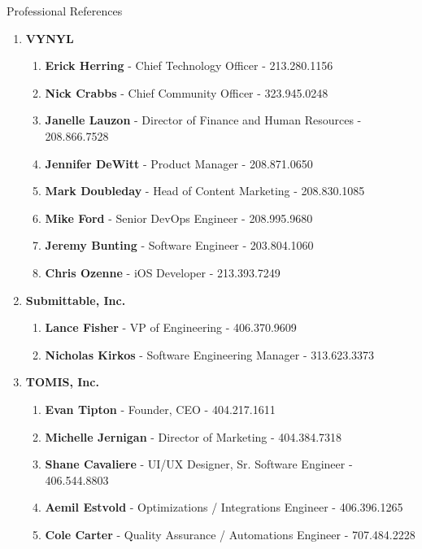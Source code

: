 \documentclass[oneside]{article}%
\begin{document}
\newpage
\noindent
\huge{Professional References}\\
\small
\begin{enumerate}[]
	\item \large \textbf{VYNYL} \small
		\begin{enumerate}[]
			\item \textbf{Erick Herring} - Chief Technology Officer - 213.280.1156
			\item \textbf{Nick Crabbs} - Chief Community Officer - 323.945.0248
			\item \textbf{Janelle Lauzon} - Director of Finance and Human Resources - 208.866.7528
			\item \textbf{Jennifer DeWitt} - Product Manager - 208.871.0650
			\item \textbf{Mark Doubleday} - Head of Content Marketing - 208.830.1085
			\item \textbf{Mike Ford} - Senior DevOps Engineer - 208.995.9680
			\item \textbf{Jeremy Bunting} - Software Engineer - 203.804.1060
			\item \textbf{Chris Ozenne} - iOS Developer - 213.393.7249
		\end{enumerate}
	\item \large \textbf{Submittable, Inc.} \small
		\begin{enumerate}[]
			\item \textbf{Lance Fisher} - VP of Engineering - 406.370.9609
			\item \textbf{Nicholas Kirkos} - Software Engineering Manager - 313.623.3373
		\end{enumerate}
	\item \large \textbf{TOMIS, Inc.} \small
		\begin{enumerate}[]
			\item \textbf{Evan Tipton} - Founder, CEO - 404.217.1611
			\item \textbf{Michelle Jernigan} - Director of Marketing - 404.384.7318
			\item \textbf{Shane Cavaliere} - UI/UX Designer, Sr. Software Engineer - 406.544.8803
			\item \textbf{Aemil Estvold} - Optimizations / Integrations Engineer - 406.396.1265
			\item \textbf{Cole Carter} - Quality Assurance / Automations Engineer - 707.484.2228
		\end{enumerate}

\end{enumerate}
\end{document}
